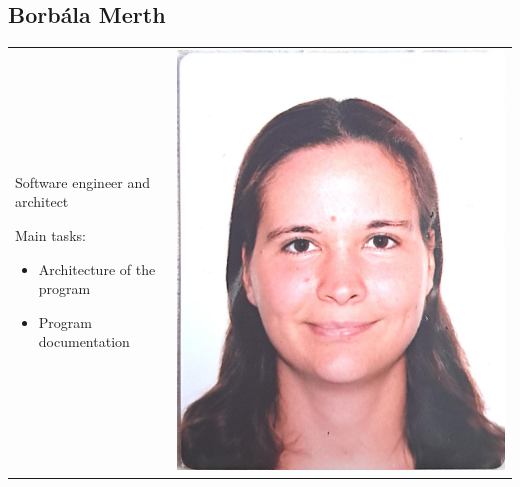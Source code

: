 \documentclass{article}
\begin{document}
\subsection{Borbála Merth}
    \begin{tabular}{@{}p{}@{} p{}@{}}
    Software engineer and architect
    
    Main tasks:
    \begin{itemize}
        \item Architecture of the program
        \item Program documentation
    \end{itemize}
    &
    \includegraphics[width=\linewidth]{img/Borbala_Merth.jpg}
    \end{tabular}
\end{document}
